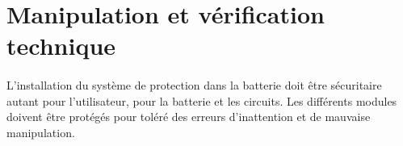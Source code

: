 \section{Manipulation et vérification technique}
\paragraph*{}
L'installation du système de protection dans la batterie doit être sécuritaire autant pour l'utilisateur, pour la batterie et les circuits. Les différents modules doivent être protégés pour toléré des erreurs d'inattention et de mauvaise manipulation. 